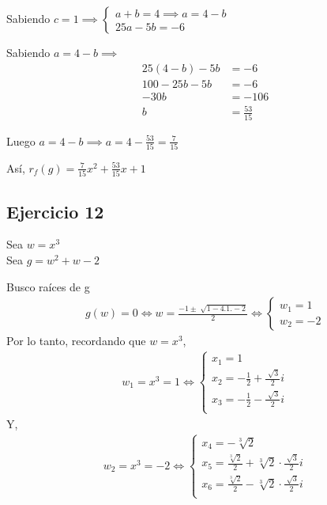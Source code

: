 Sabiendo $ c = 1 \implies \begin{cases}
    a+b = 4 \implies a = 4-b \\
    25a-5b = -6
\end{cases} $

Sabiendo $ a = 4-b \implies $
\begin{align*}
    25(4-b) - 5b &= -6 \\
    100 - 25b - 5b &= -6 \\
    -30b &= -106 \\
    b &= \frac{53}{15}
\end{align*}

Luego $ a = 4-b \implies a = 4- \frac{53}{15} = \frac{7}{15}$

Así, $ r_{f}(g) = \frac{7}{15}x^2 + \frac{53}{15}x +1 $

\subsection{Ejercicio 12}

Sea $ w = x^3 $ \\
Sea $ g = w^2 + w - 2 $

Busco raíces de g
\begin{align*}
    g(w) = 0 \iff w = \frac{-1 \pm \sqrt[]{1-4.1.-2}}{2} \iff \begin{cases}
        w_1 = 1 \\
        w_2 = -2
    \end{cases}
\end{align*}
Por lo tanto, recordando que $ w = x^3 $,
\begin{align*}
    w_1 = x^3 = 1 \iff \begin{cases}
        x_1 = 1 \\
        x_2 = -\frac{1}{2} + \frac{\sqrt[]{3}}{2}i \\
        x_3 = -\frac{1}{2} - \frac{\sqrt[]{3}}{2}i \\
    \end{cases}
\end{align*}
Y,
\begin{align*}
    w_2 = x^3 = -2 \iff \begin{cases}
        x_4 = -\sqrt[3]{2} \\
        x_5 = \frac{\sqrt[3]{2}}{2} + \sqrt[3]{2} \cdot \frac{\sqrt[]{3}}{2}i \\
        x_6 = \frac{\sqrt[3]{2}}{2} - \sqrt[3]{2} \cdot \frac{\sqrt[]{3}}{2}i \\
    \end{cases}
\end{align*}

